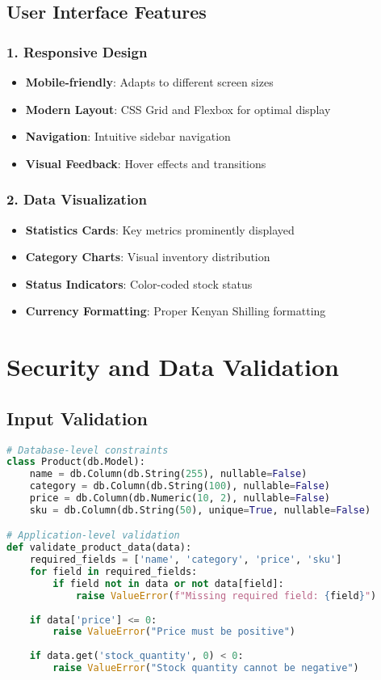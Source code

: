 \documentclass[12pt,a4paper]{article}
\begin{document}
\subsection{User Interface Features}

\subsubsection{1. Responsive Design}
\begin{itemize}
    \item \textbf{Mobile-friendly}: Adapts to different screen sizes
    \item \textbf{Modern Layout}: CSS Grid and Flexbox for optimal display
    \item \textbf{Navigation}: Intuitive sidebar navigation
    \item \textbf{Visual Feedback}: Hover effects and transitions
\end{itemize}

\subsubsection{2. Data Visualization}
\begin{itemize}
    \item \textbf{Statistics Cards}: Key metrics prominently displayed
    \item \textbf{Category Charts}: Visual inventory distribution
    \item \textbf{Status Indicators}: Color-coded stock status
    \item \textbf{Currency Formatting}: Proper Kenyan Shilling formatting
\end{itemize}

\section{Security and Data Validation}

\subsection{Input Validation}

\begin{lstlisting}[language=Python, caption=Data Validation Implementation]
# Database-level constraints
class Product(db.Model):
    name = db.Column(db.String(255), nullable=False)
    category = db.Column(db.String(100), nullable=False)
    price = db.Column(db.Numeric(10, 2), nullable=False)
    sku = db.Column(db.String(50), unique=True, nullable=False)

# Application-level validation
def validate_product_data(data):
    required_fields = ['name', 'category', 'price', 'sku']
    for field in required_fields:
        if field not in data or not data[field]:
            raise ValueError(f"Missing required field: {field}")
    
    if data['price'] <= 0:
        raise ValueError("Price must be positive")
    
    if data.get('stock_quantity', 0) < 0:
        raise ValueError("Stock quantity cannot be negative")
\end{lstlisting}
\end{document}
